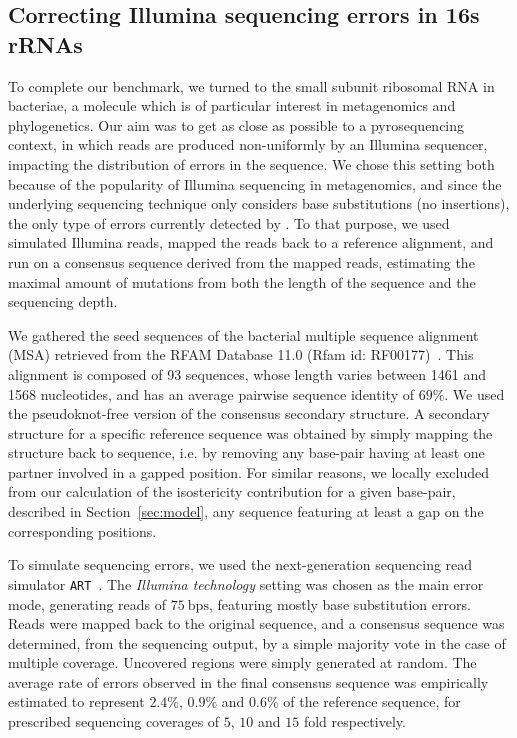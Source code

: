 \subsection{Correcting Illumina sequencing errors in 16s rRNAs}
\label{sec:16S}

To complete our benchmark, we turned to the small subunit ribosomal RNA in bacteriae, a molecule which is of particular interest  in metagenomics and phylogenetics. Our aim was to get as close as possible to a pyrosequencing context, in which reads are produced non-uniformly by an Illumina sequencer, impacting the distribution of errors in the sequence. 
We chose this setting both because of the popularity of Illumina sequencing in metagenomics, and since the underlying sequencing technique only considers base substitutions (no insertions), the only type of errors currently detected by \RNApyro.
To that purpose, we used simulated Illumina reads, mapped the reads back to a reference alignment, and run \RNApyro on a consensus sequence derived from the mapped reads, estimating the maximal amount of mutations from both the length of the sequence and the sequencing depth.


We gathered the seed sequences of the bacterial multiple sequence alignment (MSA) retrieved from the RFAM Database 11.0 (Rfam id: RF00177)~\cite{gardner2011rfam}. This alignment is composed of 93 sequences, whose length varies between 1461 and 1568 nucleotides, and has an average pairwise sequence identity of $69\%$. We used the pseudoknot-free version of the consensus secondary structure. A secondary structure for a specific reference sequence was obtained by simply mapping the structure back to sequence, i.e. by removing any base-pair having at least one partner involved in a gapped position. For similar reasons, we locally excluded from our calculation of the isostericity contribution for a given base-pair, described in Section~\ref{sec:model}, any sequence featuring at least a gap on the corresponding positions.

To simulate sequencing errors, we used the next-generation sequencing read simulator 
{\tt ART}~\cite{huang2012art}. The \emph{Illumina technology} setting was chosen as the main error mode, generating reads of $75~\text{bps}$, featuring mostly base substitution errors. Reads were mapped back to the original sequence, and a consensus sequence was determined, from the sequencing output, by a simple majority vote in the case of multiple coverage. Uncovered regions were simply generated at random. The average  rate of errors observed in the final consensus sequence was empirically estimated to represent $2.4\%$, $0.9\%$ and $0.6\%$ of the reference sequence, for prescribed sequencing coverages of $5$, $10$ and $15$ fold respectively.

